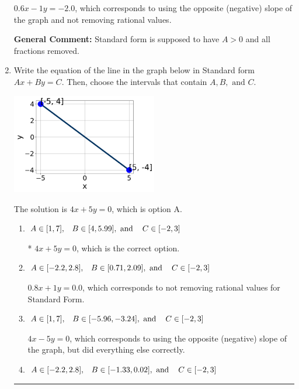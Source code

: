 \documentclass{extbook}[14pt]
\newcommand{\litem}[1]{\item #1

\rule{\textwidth}{0.4pt}}
\begin{document}
\begin{enumerate}
{\begin{enumerate}[label=\Alph*.]
 $0.6x - 1y = -2.0$, which corresponds to using the opposite (negative) slope of the graph and not removing rational values.
\end{enumerate}

\textbf{General Comment:} Standard form is supposed to have $A > 0$ and all fractions removed.
}
\litem{
Write the equation of the line in the graph below in Standard form $Ax+By=C$. Then, choose the intervals that contain $A, B, \text{ and } C$.

\begin{center}
    \includegraphics[width=0.5\textwidth]{../Figures/linearGraphToStandardA.png}
\end{center}


The solution is \( 4x + 5y = 0 \), which is option A.\begin{enumerate}[label=\Alph*.]
\item \( A \in [1, 7], \hspace{3mm} B \in [4, 5.99], \text{ and } \hspace{3mm} C \in [-2, 3] \)

* $4x + 5y = 0$, which is the correct option.
\item \( A \in [-2.2, 2.8], \hspace{3mm} B \in [0.71, 2.09], \text{ and } \hspace{3mm} C \in [-2, 3] \)

 $0.8x + 1y = 0.0$, which corresponds to not removing rational values for Standard Form.
\item \( A \in [1, 7], \hspace{3mm} B \in [-5.96, -3.24], \text{ and } \hspace{3mm} C \in [-2, 3] \)

 $4x - 5y = 0$, which corresponds to using the opposite (negative) slope of the graph, but did everything else correctly.
\item \( A \in [-2.2, 2.8], \hspace{3mm} B \in [-1.33, 0.02], \text{ and } \hspace{3mm} C \in [-2, 3] \)


\end{enumerate}}
\end{enumerate}
\end{document}
